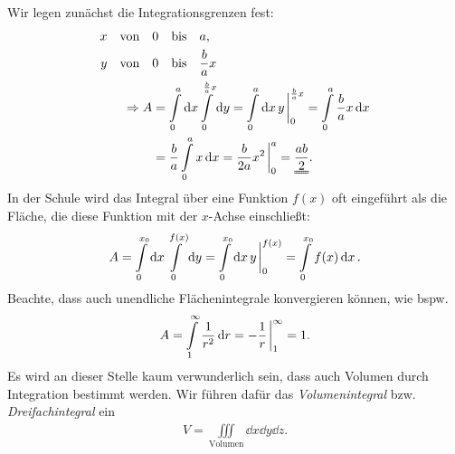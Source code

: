 \begin{wrapfigure}{r}{6cm}
    \centering
    \vspace{-5mm}
    \vspace{-2.4cm}
\end{wrapfigure}

Wir legen zunächst die Integrationsgrenzen fest: 
\begin{align}
    x \qq{von} &0 \qq{bis} a, \notag\\
    y \qq{von} &0 \qq{bis} \frac{b}{a}x \notag \\
    \Rightarrow A &= \int\limits_{0}^{a}\dd{x} \int\limits_{0}^{\frac{b}{a}x} \dd{y} = \int\limits_{0}^{a}\dd{x} y \eval_0^{\frac{b}{a}x} = \int\limits_{0}^{a} \frac{b}{a}x \dd{x} \notag \\
    &= \frac{b}{a} \int\limits_{0}^{a}x \dd{x} = \frac{b}{2a} x^2 \eval_0^a = \uuline{\frac{ab}{2}}.
\end{align}
In der Schule wird das Integral über eine Funktion $f(x)$ oft eingeführt als die Fläche, die diese Funktion mit der $x$-Achse einschließt:
\begin{align}
    A = \int\limits_{0}^{x_0} \dd{x} \int\limits_{0}^{f(x)} \dd{y} = \int\limits_{0}^{x_0} \dd{x} y \eval_0^{f(x)} = \int\limits_{0}^{x_0} f(x) \dd{x}.
\end{align}
Beachte, dass auch unendliche Flächenintegrale konvergieren können, wie bspw. 
\begin{align}
    A = \int\limits_{1}^{\infty} \frac{1}{r^2} \dd{r} = -\frac{1}{r}\eval_1^\infty = 1.
\end{align}
Es wird an dieser Stelle kaum verwunderlich sein, dass auch Volumen durch Integration bestimmt werden. Wir führen dafür das \emph{Volumenintegral} bzw. \emph{Dreifachintegral} ein 
\begin{align}
    V = \iiint\limits_{\text{Volumen}} \dd{x} \dd{y}\dd{z}.
\end{align}

